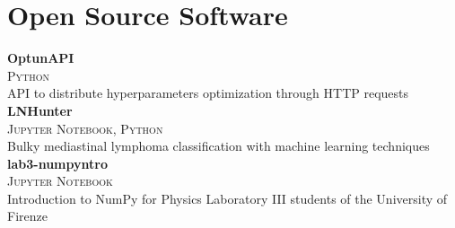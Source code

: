 \newcommand{\pkgname}[1]
  {\normalsize \color{hlcolor-0} \textbf{#1}}

\newcommand{\pkginfo}[1]
  {\small \color{hlcolor-1} \textsc{#1}}
  
\newcommand{\pkgdesc}[1]
  {\normalsize \color{maincolor} {#1}}


\section*{Open Source Software}
\begin{cvcontent}
  \pkgname{OptunAPI} \hfill
  \\
  \pkginfo{Python}\\
  \pkgdesc{API to distribute hyperparameters optimization through HTTP requests}\\ [2.5mm]
  \pkgname{LNHunter} \hfill
  \\
  \pkginfo{Jupyter Notebook, Python}\\
  \pkgdesc{Bulky mediastinal lymphoma classification with machine learning techniques}\\ [2.5mm]
  \pkgname{lab3-numpyntro} \hfill
  \\
  \pkginfo{Jupyter Notebook}\\
  \pkgdesc{Introduction to NumPy for Physics Laboratory III students of the University of Firenze}
\end{cvcontent}
